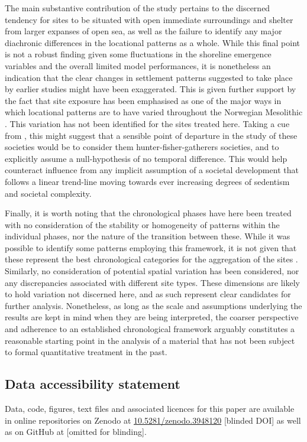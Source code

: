 \documentclass[12pt, a4paper]{article}
\begin{document}
The main substantive contribution of the study pertains to the discerned tendency for sites to be situated with open immediate surroundings and shelter from larger expanses of open sea, as well as the failure to identify any major diachronic differences in the locational patterns as a whole. While this final point is not a robust finding given some fluctuations in the shoreline emergence variables and the overall limited model performances, it is nonetheless an indication that the clear changes in settlement patterns suggested to take place by earlier studies might have been exaggerated. This is given further support by the fact that site exposure has been emphasised as one of the major ways in which locational patterns are to have varied throughout the Norwegian Mesolithic \citep[e.g.][]{lindblom1984, jaksland2001, bjerck2008, breivik2014, breivik2018}. This variation has not been identified for the sites treated here. Taking a cue from \cite{aastveit2014}, this might suggest that a sensible point of departure in the study of these societies would be to consider them hunter-fisher-gatherers societies, and to explicitly assume a null-hypothesis of no temporal difference. This would help counteract influence from any implicit assumption of a societal development that follows a linear trend-line moving towards ever increasing degrees of sedentism and societal complexity.\par 
Finally, it is worth noting that the chronological phases have here been treated with no consideration of the stability or homogeneity of patterns within the individual phases, nor the nature of the transition between these. While it was possible to identify some patterns employing this framework, it is not given that these represent the best chronological categories for the aggregation of the sites \citep{reitan2016}. Similarly, no consideration of potential spatial variation has been considered, nor any discrepancies associated with different site types. These dimensions are likely to hold variation not discerned here, and as such represent clear candidates for further analysis. Nonetheless, as long as the scale and assumptions underlying the results are kept in mind when they are being interpreted, the coarser perspective and adherence to an established chronological framework arguably constitutes a reasonable starting point in the analysis of a material that has not been subject to formal quantitative treatment in the past.\par

\subsection*{Data accessibility statement}
Data, code, figures, text files and associated licences for this paper are available in online repositories on Zenodo at \href{https://doi.org/10.5281/zenodo.3948120}{10.5281/zenodo.3948120} [blinded DOI] as well as on GitHub at [omitted for blinding]. 
\end{document}
